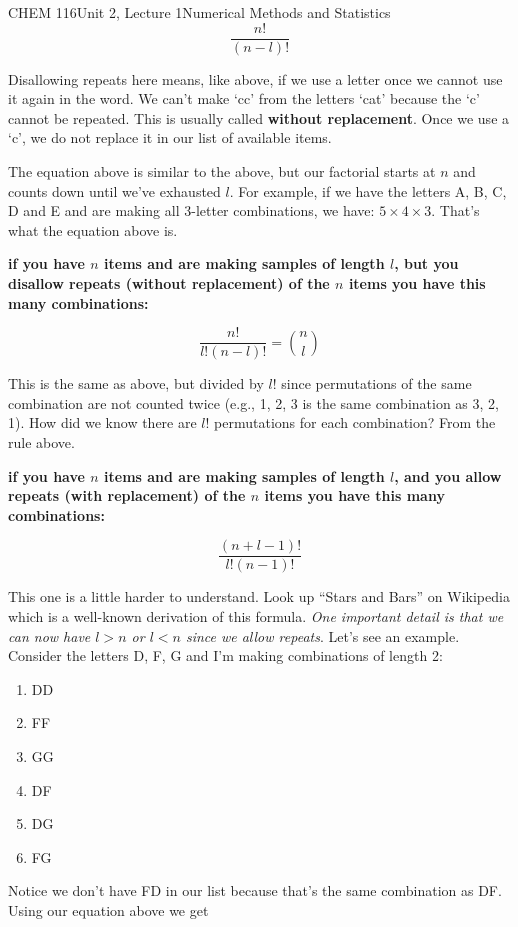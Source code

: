 \documentclass{article}
\begin{document}
\begin{tdoc}{CHEM 116}{Unit 2, Lecture 1}{Numerical Methods and Statistics}
  $$  \frac{n!}{(n - l)!}$$

  Disallowing repeats here means, like above, if we use a letter once
  we cannot use it again in the word. We can't make `cc' from the
  letters `cat' because the `c' cannot be repeated. This is usually
  called \textbf{without replacement}. Once we use a `c', we do not
  replace it in our list of available items.

  The equation above is similar to the above, but our factorial starts
  at $n$ and counts down until we've exhausted $l$. For example, if we
  have the letters A, B, C, D and E and are making all 3-letter
  combinations, we have: $5 \times 4 \times 3$. That's what the
  equation above is.

  {\bf if you have $n$ items and are making samples of length $l$, but
    you disallow repeats (without replacement) of the $n$ items you have
    this many combinations:}

  $$  \frac{n!}{l!(n - l)!} = \binom{n}{l}$$

  This is the same as above, but divided by $l!$ since permutations of
  the same combination are not counted twice (e.g., 1, 2, 3 is the
  same combination as 3, 2, 1). How did we know there are $l!$
  permutations for each combination? From the rule above.

  {\bf if you have $n$ items and are making samples of length $l$, and
    you allow repeats (with replacement) of the $n$ items you have
    this many combinations:}

  $$
  \frac{(n + l - 1)!}{l!(n - 1)!}
  $$

  This one is a little harder to understand. Look up ``Stars and
  Bars'' on Wikipedia which is a well-known derivation of this formula. {\it One
    important detail is that we can now have $l > n$ or $l < n$ since we allow
    repeats}. Let's see an example. Consider the letters D, F, G and
  I'm making combinations of length 2:

  \begin{enumerate}
  \item DD
  \item FF
  \item GG    
  \item DF
  \item DG
  \item FG
  \end{enumerate}

  Notice we don't have FD in our list because that's the same combination as DF.  Using our equation above we get


\end{tdoc}
\end{document}
